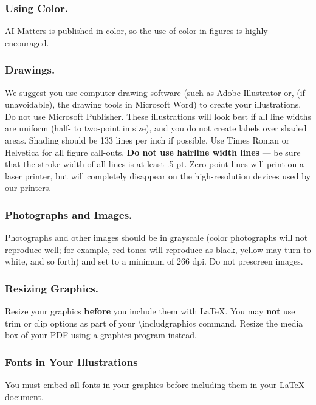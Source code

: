 \documentclass[letterpaper]{article}
\begin{document}
\subsubsection{Using Color.}
AI Matters is published in color, so the use of color in figures is highly encouraged.

\subsubsection{Drawings.}
We suggest you use computer drawing software (such as Adobe Illustrator or, (if unavoidable), the drawing tools in Microsoft Word) to create your illustrations. Do not use Microsoft Publisher. These illustrations will look best if all line widths are uniform (half- to two-point in size), and you do not create labels over shaded areas. Shading should be 133 lines per inch if possible. Use Times Roman or Helvetica for all figure call-outs. \textbf{Do not use hairline width lines} --- be sure that the stroke width of all lines is at least .5 pt. Zero point lines will print on a laser printer, but will completely disappear on the high-resolution devices used by our printers.

\subsubsection{Photographs and Images.}
Photographs and other images should be in grayscale (color photographs will not reproduce well; for example, red tones will reproduce as black, yellow may turn to white, and so forth) and set to a minimum of 266 dpi. Do not prescreen images.

\subsubsection{Resizing Graphics.}
Resize your graphics \textbf{before} you include them with LaTeX. You may \textbf{not} use trim or clip options as part of your \textbackslash includgraphics command. Resize the media box of your PDF using a graphics program instead. 

\subsubsection{Fonts in Your Illustrations}
You must embed all fonts in your graphics before including them in your LaTeX document.
\end{document}

